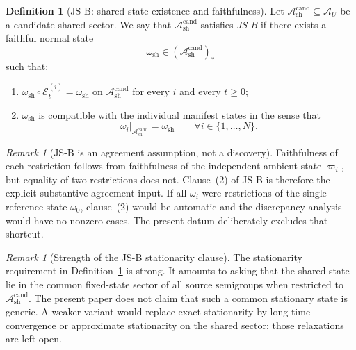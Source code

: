 \documentclass[12pt]{article}
\theoremstyle{definition}
\newtheorem{definition}[theorem]{Definition}
\theoremstyle{remark}
\newtheorem{remark}[theorem]{Remark}
\begin{document}
\begin{definition}[JS-B: shared-state existence and faithfulness]
\label{def:JSB}
Let \(\mathcal A_{\mathrm{sh}}^{\mathrm{cand}}\subseteq \mathcal A_U\)
be a candidate shared sector. We say that \(\mathcal A_{\mathrm{sh}}^{\mathrm{cand}}\)
satisfies \emph{JS-B} if there exists a faithful normal state
\[
\omega_{\mathrm{sh}}
\in
(\mathcal A_{\mathrm{sh}}^{\mathrm{cand}})_*
\]
such that:
\begin{enumerate}
\item \(\omega_{\mathrm{sh}}\circ\mathcal E_t^{(i)}=\omega_{\mathrm{sh}}\)
  on \(\mathcal A_{\mathrm{sh}}^{\mathrm{cand}}\) for every
  \(i\) and every \(t\ge 0\);
\item \(\omega_{\mathrm{sh}}\) is compatible with the individual
  manifest states in the sense that
  \[
  \omega_i|_{\mathcal A_{\mathrm{sh}}^{\mathrm{cand}}}
  =
  \omega_{\mathrm{sh}}
  \qquad
  \forall i\in\{1,\dots,N\}.
  \]
\end{enumerate}
\end{definition}

\begin{remark}[JS-B is an agreement assumption, not a discovery]
Faithfulness of each restriction follows from faithfulness of the
independent ambient state \(\varpi_i\), but equality of two restrictions
does not. Clause~(2) of JS-B is therefore the explicit substantive
agreement input. If all \(\omega_i\) were restrictions of the single
reference state \(\omega_0\), clause~(2) would be automatic and the
discrepancy analysis would have no nonzero cases. The present datum
deliberately excludes that shortcut.
\end{remark}

\begin{remark}[Strength of the JS-B stationarity clause]
The stationarity requirement in Definition~\ref{def:JSB} is strong. It
amounts to asking that the shared state lie in the common fixed-state
sector of all source semigroups when restricted to
\(\mathcal A_{\mathrm{sh}}^{\mathrm{cand}}\). The present paper does not
claim that such a common stationary state is generic. A weaker variant
would replace exact stationarity by long-time convergence or approximate
stationarity on the shared sector; those relaxations are left open.
\end{remark}
\end{document}
